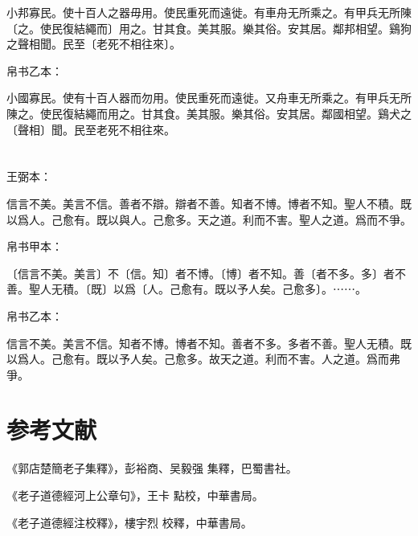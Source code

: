 \documentclass[a5paper]{ctexbook}
\begin{document}
    小邦寡民。使十百人之器毋用。使民重死而遠徙。有車舟无所乘之。有甲兵无所陳〔之。使民復結繩而〕用之。甘其食。美其服。樂其俗。安其居。鄰邦相望。鷄狗之聲相聞。民至〔老死不相往來〕。

    帛书乙本：

    小國寡民。使有十百人器而勿用。使民重死而遠徙。又舟車无所乘之。有甲兵无所陳之。使民復結繩而用之。甘其食。美其服。樂其俗。安其居。鄰國相望。鷄犬之〔聲相〕聞。民至老死不相往來。

    \chapter{}
    王弼本：

    信言不美。美言不信。善者不辯。辯者不善。知者不博。博者不知。聖人不積。既以爲人。己愈有。既以與人。己愈多。天之道。利而不害。聖人之道。爲而不爭。

    
    帛书甲本：

    〔信言不美。美言〕不〔信。知〕者不博。〔博〕者不知。善〔者不多。多〕者不善。聖人无積。〔既〕以爲〔人。己愈有。既以予人矣。己愈多〕。⋯⋯。

    帛书乙本：

    信言不美。美言不信。知者不博。博者不知。善者不多。多者不善。聖人无積。既以爲人。己愈有。既以予人矣。己愈多。故天之道。利而不害。人之道。爲而弗爭。

    \chapter*{参考文献}
    《郭店楚簡老子集釋》，彭裕商、吴毅强 集釋，巴蜀書社。

    《老子道德經河上公章句》，王卡 點校，中華書局。

    《老子道德經注校釋》，樓宇烈 校釋，中華書局。
\end{document}
